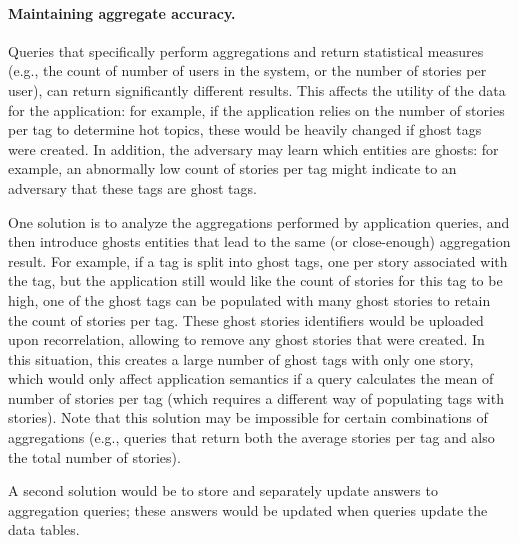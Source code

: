 \paragraph{Maintaining aggregate accuracy.}
Queries that specifically perform aggregations and return statistical measures (e.g.,
the count of number of users in the system, or the number of stories per user), can return
significantly different results. This affects the utility of the data for the application: for
example, if the application relies on the number of stories per tag to determine hot topics, these
would be heavily changed if ghost tags were created.  In addition, the adversary may learn which
entities are ghosts: for example, an abnormally low count of stories per tag might indicate to an
adversary that these tags are ghost tags.  

One solution is to analyze the aggregations performed by application queries, and then
introduce ghosts entities that lead to the same (or close-enough) aggregation result. For example,
if a tag is split into ghost tags, one per story associated with the tag, but the application still
would like the count of stories for this tag to be high, one of the ghost tags can be populated with
many ghost stories to retain the count of stories per tag. These ghost stories identifiers would be
uploaded upon recorrelation, allowing \sys{} to remove any ghost stories that were created. In this
situation, this creates a large number of ghost tags with only one story, which would only affect
application semantics if a query calculates the mean of number of stories per tag (which requires a
different way of populating tags with stories). Note that this solution may be impossible for  
certain combinations of aggregations (e.g., queries that return both the average stories per tag and also
the total number of stories).

A second solution would be to store and separately update answers to aggregation queries;
these answers would be updated when queries update the data tables.


